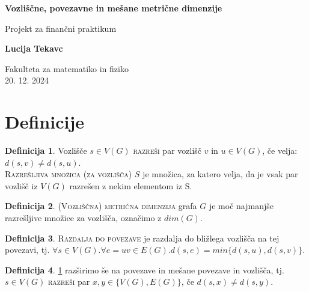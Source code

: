 \documentclass[a4paper,12pt]{article}
\theoremstyle{definition}
\newtheorem{definicija}{Definicija}[section]
\theoremstyle{remark}
\theoremstyle{definition}
\begin{document}
\begin{titlepage}
    \begin{center}
        \vspace*{5cm}

        \Huge
        \textbf{Vozliščne, povezavne in mešane metrične dimenzije}

        \vspace{0.5cm}
        \LARGE
        Projekt za finančni praktikum

        \vspace{1.5cm}

        \textbf{Lucija Tekavc}

        \vfill

        \Large
        Fakulteta za matematiko in fiziko\\
        20. 12. 2024
    \end{center}
\end{titlepage}


\section*{Definicije}

\begin{definicija}\label{def1}
    Vozlišče $s \in V(G)$ \textsc{razreši} par vozlišč $v$ in $u \in V(G)$,
    če velja: $d(s, v) \neq d(s, u)$. \\
    \textsc{Razrešljiva množica (za vozlišča)} $S$ je množica, za katero velja, da je
    vsak par vozlišč iz $V(G)$ razrešen z nekim elementom iz S.
\end{definicija}

\begin{definicija}
    \textsc{(Vozliščna) metrična dimenzija} grafa $G$ je moč najmanjše
    razrešljive množice za vozlišča, označimo z $dim(G)$.
\end{definicija}

\begin{definicija}
    \textsc{Razdalja do povezave} je razdalja do bližlega vozlišča na tej
    povezavi, tj. $\forall s \in V(G). \forall e = uv \in E(G).d(s, e)=min\{d(s,u),d(s,v)\}$.
\end{definicija}

\begin{definicija}
    \ref{def1} razširimo še na povezave in mešane povezave in vozlišča, tj.
    $s \in V(G)$ \textsc{razreši} par $x, y \in \{V(G), E(G)\}$, če
    $d(s, x) \neq d(s, y)$.
\end{definicija}
\end{document}
